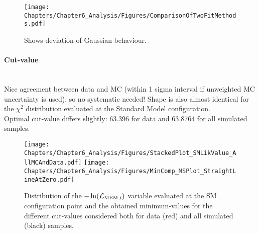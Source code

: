 \begin{figure}[h!t]
 \centering
 \texttt{[image: Chapters/Chapter6\_Analysis/Figures/ComparisonOfTwoFitMethods.pdf]}
 \caption{Shows deviation of Gaussian behaviour.}
\end{figure}

\paragraph{Cut-value} \hfill \\
Nice agreement between data and MC (within 1 sigma interval if unweighted MC uncertainty is used), so no systematic needed! 
Shape is also almost identical for the $\chi^{2}$ distribution evaluated at the Standard Model configuration.\\
Optimal cut-value differs slightly: 63.396 for data and 63.8764 for all simulated samples.

\begin{figure}[h!t]
 \centering
 \texttt{[image: Chapters/Chapter6\_Analysis/Figures/StackedPlot\_SMLikValue\_AllMCAndData.pdf]}
 \texttt{[image: Chapters/Chapter6\_Analysis/Figures/MinComp\_MSPlot\_StraightLineAtZero.pdf]}            %
 \caption{Distribution of the $-\ln(\mathcal{L}_{\textrm{MEM}, i})$ variable evaluated at the SM configuration point and the obtained minimum-values for the different cut-values considered both for data (red) and all simulated (black) samples.}
\end{figure}
